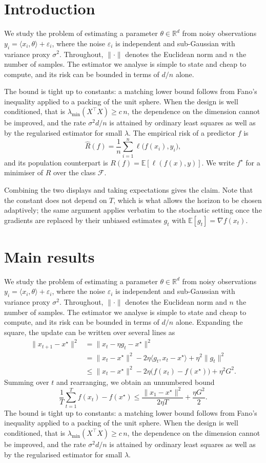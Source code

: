 \newcommand{\proseA}{We study the problem of estimating a parameter $\theta \in \mathbb{R}^d$ from noisy observations $y_i = \langle x_i, \theta\rangle + \varepsilon_i$, where the noise $\varepsilon_i$ is independent and sub-Gaussian with variance proxy $\sigma^2$. Throughout, $\|\cdot\|$ denotes the Euclidean norm and $n$ the number of samples. The estimator we analyse is simple to state and cheap to compute, and its risk can be bounded in terms of $d/n$ alone.}
\newcommand{\proseB}{The bound is tight up to constants: a matching lower bound follows from Fano's inequality applied to a packing of the unit sphere. When the design is well conditioned, that is $\lambda_{\min}(X^\top X) \geq c\, n$, the dependence on the dimension cannot be improved, and the rate $\sigma^2 d / n$ is attained by ordinary least squares as well as by the regularised estimator for small $\lambda$.}
\newcommand{\proseC}{Combining the two displays and taking expectations gives the claim. Note that the constant does not depend on $T$, which is what allows the horizon to be chosen adaptively; the same argument applies verbatim to the stochastic setting once the gradients are replaced by their unbiased estimates $g_t$ with $\mathbb{E}[g_t] = \nabla f(x_t)$.}

\section{Introduction}
\proseA

\proseB
The empirical risk of a predictor $f$ is
\begin{equation}\label{eq:risk}
\widehat{R}(f) = \frac{1}{n}\sum_{i=1}^{n} \ell\bigl(f(x_i), y_i\bigr),
\end{equation}
and its population counterpart is $R(f) = \mathbb{E}[\ell(f(x),y)]$. We write $f^\star$ for a minimiser of $R$ over the class $\mathcal{F}$.

\proseC

\section{Main results}
\proseA
Expanding the square, the update can be written over several lines as
\begin{align}
\|x_{t+1} - x^\star\|^2 &= \|x_t - \eta g_t - x^\star\|^2 \label{eq:a1}\\
&= \|x_t - x^\star\|^2 - 2\eta \langle g_t, x_t - x^\star\rangle + \eta^2 \|g_t\|^2 \label{eq:a2}\\
&\leq \|x_t - x^\star\|^2 - 2\eta \bigl(f(x_t) - f(x^\star)\bigr) + \eta^2 G^2. \label{eq:a3}
\end{align}
Summing over $t$ and rearranging, we obtain an unnumbered bound
\[
\frac{1}{T}\sum_{t=1}^{T} f(x_t) - f(x^\star) \leq \frac{\|x_1 - x^\star\|^2}{2\eta T} + \frac{\eta G^2}{2}.
\]
\proseB


